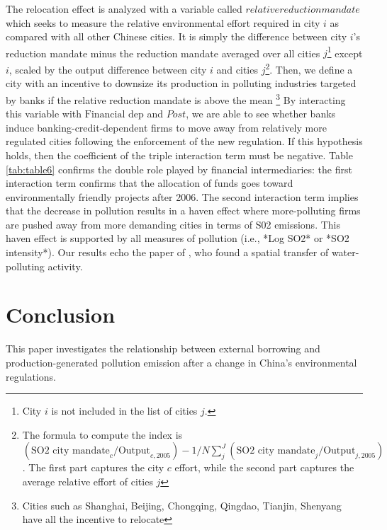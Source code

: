 \documentclass[12pt]{article}
\begin{document}
The relocation effect is analyzed with a variable called $relative reduction mandate$ which seeks to measure the relative environmental effort required in city $i$ as compared with all other Chinese cities. It is simply the difference between city $i$'s reduction mandate minus the reduction mandate averaged over all cities $j$\footnote{City $i$  is not included in the list of cities $j$.} except $i$, scaled by the output difference between city $i$ and cities $j$\footnote{The formula to compute the index is $(\text{SO2 city mandate}_c/\text{Output}_{c, 2005}) - 1/N\sum _j ^J(\text{SO2 city mandate}_j/\text{Output}_{j, 2005})$. The first part captures the city $c$ effort, while the second part captures the average relative effort of cities $j$}. Then, we define a city with an incentive to downsize its production in polluting industries targeted by banks if the relative reduction mandate is above the mean \footnote{Cities such as Shanghai, Beijing, Chongqing, Qingdao, Tianjin, Shenyang have all the incentive to relocate} By interacting this variable with $\text{Financial dep}$ and $Post$, we are able to see whether banks induce banking-credit-dependent firms to move away from relatively more regulated cities following the enforcement of the new regulation. If this hypothesis holds, then the coefficient of the triple interaction term must be negative. Table \ref{tab:table6} confirms the double role played by financial intermediaries: the first interaction term confirms that the allocation of funds goes toward environmentally friendly projects after 2006. The second interaction term implies that the decrease in pollution results in a haven effect where more-polluting firms are pushed away from more demanding cities in terms of S02 emissions. This haven effect is supported by all measures of pollution (i.e., *Log SO2* or *SO2 intensity*). Our results echo the paper of \cite{Chen2018-ki}, who found a spatial transfer of water-polluting activity.

\section{Conclusion}

This paper investigates the relationship between external borrowing and production-generated pollution emission after a change in China’s environmental regulations.
\end{document}

